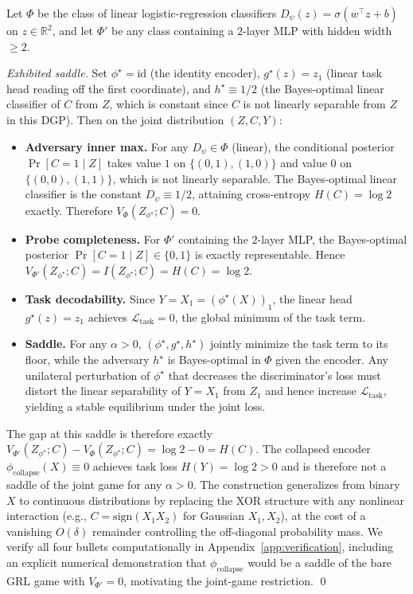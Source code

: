 \documentclass{article}
\begin{document}
Let $\Phi$ be the class of linear logistic-regression classifiers $D_\psi(z) = \sigma(w^\top z + b)$ on $z \in \mathbb{R}^2$, and let $\Phi'$ be any class containing a $2$-layer MLP with hidden width $\ge 2$.

\textit{Exhibited saddle.} Set $\phi^\star = \mathrm{id}$ (the identity encoder), $g^\star(z) = z_1$ (linear task head reading off the first coordinate), and $h^\star \equiv 1/2$ (the Bayes-optimal linear classifier of $C$ from $Z$, which is constant since $C$ is not linearly separable from $Z$ in this DGP). Then on the joint distribution $(Z, C, Y)$:
\begin{itemize}
\item \textbf{Adversary inner max.} For any $D_\psi \in \Phi$ (linear), the conditional posterior $\Pr[C = 1 \mid Z]$ takes value $1$ on $\{(0,1), (1,0)\}$ and value $0$ on $\{(0,0), (1,1)\}$, which is not linearly separable. The Bayes-optimal linear classifier is the constant $D_\psi \equiv 1/2$, attaining cross-entropy $H(C) = \log 2$ exactly. Therefore $V_\Phi(Z_{\phi^\star}; C) = 0$.
\item \textbf{Probe completeness.} For $\Phi'$ containing the $2$-layer MLP, the Bayes-optimal posterior $\Pr[C = 1 \mid Z] \in \{0, 1\}$ is exactly representable. Hence $V_{\Phi'}(Z_{\phi^\star}; C) = I(Z_{\phi^\star}; C) = H(C) = \log 2$.
\item \textbf{Task decodability.} Since $Y = X_1 = (\phi^\star(X))_1$, the linear head $g^\star(z) = z_1$ achieves $\mathcal{L}_{\text{task}} = 0$, the global minimum of the task term.
\item \textbf{Saddle.} For any $\alpha > 0$, $(\phi^\star, g^\star, h^\star)$ jointly minimize the task term to its floor, while the adversary $h^\star$ is Bayes-optimal in $\Phi$ given the encoder. Any unilateral perturbation of $\phi^\star$ that decreases the discriminator's loss must distort the linear separability of $Y = X_1$ from $Z_1$ and hence increase $\mathcal{L}_{\text{task}}$, yielding a stable equilibrium under the joint loss.
\end{itemize}

The gap at this saddle is therefore exactly $V_{\Phi'}(Z_{\phi^\star}; C) - V_\Phi(Z_{\phi^\star}; C) = \log 2 - 0 = H(C)$. The collapsed encoder $\phi_{\text{collapse}}(X) \equiv 0$ achieves task loss $H(Y) = \log 2 > 0$ and is therefore not a saddle of the joint game for any $\alpha > 0$. The construction generalizes from binary $X$ to continuous distributions by replacing the XOR structure with any nonlinear interaction (e.g., $C = \mathrm{sign}(X_1 X_2)$ for Gaussian $X_1, X_2$), at the cost of a vanishing $O(\delta)$ remainder controlling the off-diagonal probability mass. We verify all four bullets computationally in Appendix~\ref{app:verification}, including an explicit numerical demonstration that $\phi_{\text{collapse}}$ would be a saddle of the bare GRL game with $V_{\Phi'} = 0$, motivating the joint-game restriction. \qed
\end{document}
